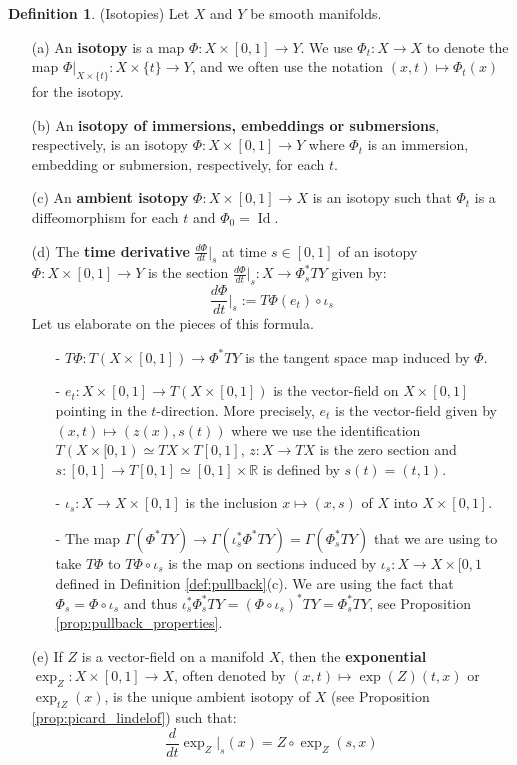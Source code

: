 \documentclass[12pt]{article}
\theoremstyle{definition}
\newtheorem{definition}[theorem]{Definition}
\numberwithin{equation}{section}
\newcommand{\R}{{\mathbb R}}
\newcommand{\op}{\operatorname}
\begin{document}
\begin{definition} \label{def:isotopies} (Isotopies) Let $X$ and $Y$ be smooth manifolds.
\begin{itemize}
	\item[(a)] An {\bf isotopy} is a map $\Phi:X \times [0,1] \to Y$. We use $\Phi_t:X \to X$ to denote the map $\Phi|_{X \times \{t\}}:X \times \{t\} \to Y$, and we often use the notation $(x,t) \mapsto \Phi_t(x)$ for the isotopy. 
	\item[(b)] An {\bf isotopy of immersions, embeddings or submersions}, respectively, is an isotopy $\Phi:X \times [0,1] \to Y$ where $\Phi_t$ is an immersion, embedding or submersion, respectively, for each $t$.
	\item[(c)] An {\bf ambient isotopy} $\Phi:X \times [0,1] \to X$ is an isotopy such that $\Phi_t$ is a diffeomorphism for each $t$ and $\Phi_0 = \op{Id}$. 
	\item[(d)] The {\bf time derivative} $\frac{d\Phi}{dt}|_s$ at time $s \in [0,1]$ of an isotopy $\Phi:X 
\times [0,1] \to Y$ is the section $\frac{d\Phi}{dt}|_s:X \to \Phi_s^*TY$ given by:
\[
\frac{d\Phi}{dt}|_s := T\Phi(e_t) \circ \iota_s
\]
Let us elaborate on the pieces of this formula.
\begin{itemize}
\item[-] $T\Phi:T(X \times [0,1]) \to \Phi^*TY$ is the tangent space map induced by $\Phi$.
\item[-] $e_t:X \times [0,1] \to T(X \times [0,1])$ is the vector-field on $X \times [0,1]$ pointing in the $t$-direction. More precisely, $e_t$ is the vector-field given by $(x,t) \mapsto (z(x),s(t))$ where we use the identification $T(X \times [0,1) \simeq TX \times T[0,1]$, $z:X \to TX$ is the zero section and $s:[0,1] \to T[0,1] \simeq [0,1] \times \R$ is defined by $s(t) = (t,1)$.

\item[-] $\iota_s:X \to X \times [0,1]$ is the inclusion $x \mapsto (x,s)$ of $X$ into $X \times [0,1]$. 
\item[-] The map $\Gamma(\Phi^*TY) \to \Gamma(\iota_s^*\Phi^*TY) = \Gamma(\Phi_s^*TY)$ that we are using to take $T\Phi$ to $T\Phi \circ \iota_s$ is the map on sections induced by $\iota_s:X \to X \times [0,1$ defined in Definition \ref{def:pullback}(c). We are using the fact that $\Phi_s = \Phi \circ \iota_s$ and thus $\iota_s^*\Phi_s^*TY = (\Phi \circ \iota_s)^*TY = \Phi_s^*TY$, see Proposition \ref{prop:pullback_properties}.
\end{itemize}
\item[(e)] If $Z$ is a vector-field on a manifold $X$, then the {\bf exponential} $\op{exp}_Z:X \times [0,1] \to X$, often denoted by $(x,t) \mapsto \op{exp}(Z)(t,x)$ or $\op{exp}_{tZ}(x)$, is the unique ambient isotopy of $X$ (see Proposition \ref{prop:picard_lindelof}) such that:
\[
\frac{d}{dt}\op{exp}_Z|_s(x) = Z \circ \op{exp}_Z(s,x)
\]
\end{itemize}
\end{definition}
\end{document}
